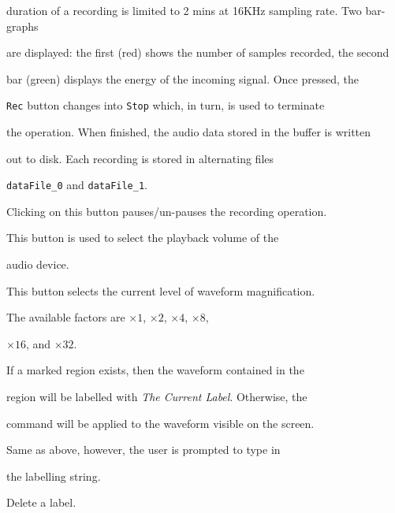 \begin{optlist}
      duration of a recording is limited to 2 mins at 16KHz sampling rate. Two bar-graphs 


      are displayed: the first (red) shows the number of samples recorded, the second


      bar (green) displays the energy of the incoming signal. Once pressed, the


      \texttt{Rec} button changes into \texttt{Stop} which, in turn, is used to terminate


      the operation. When finished, the audio data stored in the buffer is written


      out to disk. Each recording is stored in alternating files 


      \texttt{dataFile\_0} and \texttt{dataFile\_1}.





   Clicking on this button pauses/un-pauses the recording operation.





   This button is used to select the playback volume of the


      audio device.





   This button selects the current level of waveform magnification.


      The available factors are $\times 1$,  $\times 2$,  $\times 4$,  $\times 8$, 


       $\times 16$, and  $\times 32$.





   If a marked region exists, then the waveform contained in the 


      region will be labelled with {\em The Current Label}. Otherwise, the 


      command will be applied to the waveform visible on the screen.





   Same as above, however, the user is prompted to type in 


      the labelling string.





   Delete a label.






\end{optlist}
